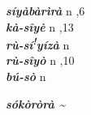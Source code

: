 \begin{multicols}{2}
{{\bfseries\itshape síyàbàrìrà}} \relax  n  ,6  \relax   \relax  \\
{{\bfseries\itshape kà-sîyè}} \relax  n  ,13  \relax   \relax  \\
{{\bfseries\itshape rù-sí\textsuperscript{!}yízà}} \relax  n   \relax  {} \relax   \relax  \\
{{\bfseries\itshape rù-sîyò}} \relax  n  ,10  \relax   \relax  \\
{{\bfseries\itshape bú-sò}} \relax  n   \relax  {} \relax   \relax  \\
{{\bfseries\itshape sókòròrà {\textasciitilde}}

}
\end{multicols}
